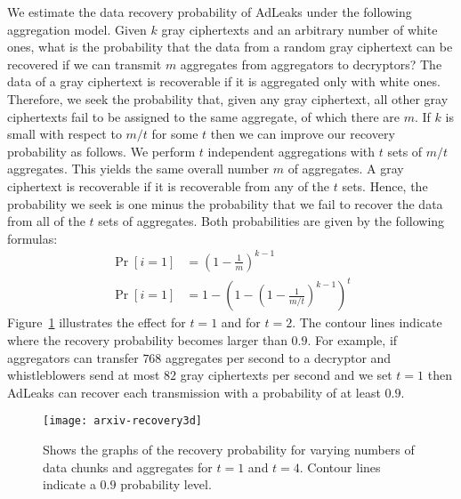 \documentclass[twocolumn,10pt]{article}
\newcommand{\Kp}{0.9}
\newcommand{\Kpktiii}{768}
\newcommand{\Kmaxdata}{82}
\begin{document}
We estimate the data recovery probability of AdLeaks under the following
aggregation model.  Given $k$ gray ciphertexts and an arbitrary number of
white ones, what is the probability that the data from a random gray
ciphertext can be recovered if we can transmit $m$ aggregates from
aggregators to decryptors?  The data of a gray ciphertext is recoverable if
it is aggregated only with white ones.  Therefore, we seek the probability
that, given any gray ciphertext, all other gray ciphertexts fail to be
assigned to the same aggregate, of which there are $m$.
If $k$ is small with respect to $m/t$ for some $t$ then we can improve our
recovery probability as follows.  We perform $t$ independent aggregations
with $t$ sets of $m/t$ aggregates.  This yields the same overall number $m$
of aggregates.  A gray ciphertext is recoverable if it is recoverable from
any of the $t$ sets.  Hence, the probability we seek is one minus the
probability that we fail to recover the data from all of the $t$ sets of
aggregates.  Both probabilities are given by the following formulas:
\begin{align*}
  \Pr[i=1] &= (1-\frac{1}{m})^{k-1}  \\
  \Pr[i=1] &= 1-(1-(1-\frac{1}{m/t})^{k-1})^t
\end{align*}
Figure~\ref{fig:recovery3d} illustrates the effect for $t=1$ and for $t=2$.
The contour lines indicate where the recovery probability becomes larger
than $\Kp$.
For example, if aggregators can transfer $\Kpktiii$ aggregates per second to
a decryptor and whistleblowers send at most $\Kmaxdata$ gray ciphertexts per
second and we set $t=1$ then AdLeaks can recover each transmission with a
probability of at least $\Kp$.

\begin{figure}
  \texttt{[image: arxiv-recovery3d]}
  \caption{Shows the graphs of the recovery probability for varying numbers
    of data chunks and aggregates for $t=1$ and $t=4$.  Contour lines
    indicate a $0.9$ probability level.}
  \label{fig:recovery3d}
\end{figure}
\end{document}

